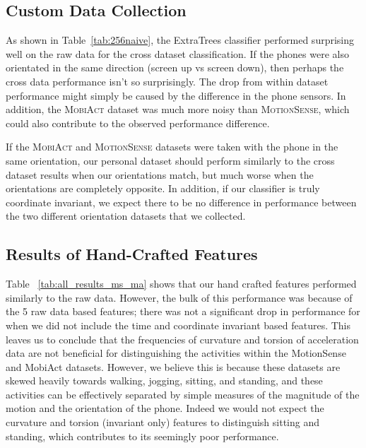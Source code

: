 


\subsection{Custom Data Collection}
\label{sub:og_data}

As shown in Table~\ref{tab:256naive}, the ExtraTrees classifier performed surprising well on the raw data for the cross dataset classification. If the phones were also orientated in the same direction (screen up vs screen down), then perhaps the cross data performance isn't so surprisingly. The drop from within dataset performance might simply be caused by the difference in the phone sensors. In addition, the \textsc{MobiAct} dataset was much more noisy than \textsc{MotionSense}, which could also contribute to the observed performance difference. 

If the \textsc{MobiAct} and \textsc{MotionSense} datasets
were taken with the phone in the same orientation, our personal dataset should perform similarly to the cross dataset results when our orientations match, but much worse when the orientations are completely opposite. In addition, if our classifier is truly coordinate invariant, we expect there to be no difference in performance between the two different orientation datasets that we collected. 


\subsection{Results of Hand-Crafted Features}
\label{sub:final_results}

Table ~\ref{tab:all_results_ms_ma} shows that our hand crafted features performed similarly to the raw data. However, the bulk of this performance was because of the 5 raw data based features; there was not a significant drop in performance for when we did not include the time and coordinate invariant based features. This leaves us to conclude that the frequencies of curvature and torsion of acceleration data are not beneficial for distinguishing the activities within the MotionSense and MobiAct datasets. However, we believe this is because these datasets are skewed heavily towards walking, jogging, sitting, and standing, and these activities can be effectively separated by simple measures of the magnitude of the motion and the orientation of the phone. Indeed we would not expect the curvature and torsion (invariant only) features to distinguish sitting and standing, which contributes to its seemingly poor performance. 

